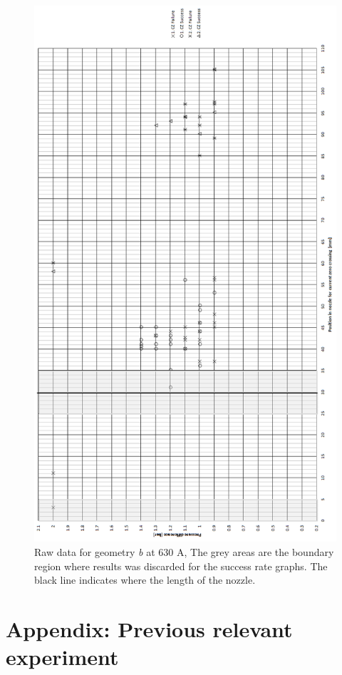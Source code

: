 \documentclass[10pt,a4paper]{article}
\begin{document}
\begin{figure}[H]
\centering
\includegraphics[scale=0.55]{Bilder/Results/rawData630AgeoB.png}
\caption{Raw data for geometry \textit{b} at 630 A, The grey areas are the boundary region where results was discarded for the success rate graphs. The black line indicates where the length of the nozzle.} \label{fig:rawData630AgeoB}
\end{figure}

\newpage
\section{Appendix: Previous relevant experiment} \label{app:PrevReleEx}
\makeatletter 
\renewcommand{\thefigure}{B.\@arabic\c@figure}
\makeatother
\end{document}
